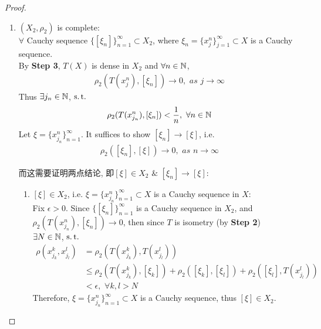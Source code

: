 \begin{thm}
\begin{proof}
\begin{enumerate}
				\item $(X_2 , \rho_2)$ is complete: \\
				$\forall$ Cauchy sequence $\{ [\xi_n] \}_{n = 1}^{\infty} \subset X_2$, where $\xi_n = \{ x_{j}^n \}_{j = 1}^{\infty} \subset X$ is a Cauchy sequence. \\
				By \textbf{Step 3}, $T(X)$ is dense in $X_2$ and $\forall n \in \mathbb{N}$,
				\begin{align}
					\rho_2(T(x_{j}^{n}) , [\xi_n]) \to 0 , \,\, as \,\, j \to \infty
				\end{align}
				Thus $\exists j_n \in \mathbb{N}$, $\operatorname{s.t.}$
				\begin{align}
					\rho_2(T(x_{j_n}^n) , [\xi_n]) < \frac{1}{n} , \,\, \forall n \in \mathbb{N}
				\end{align}
				Let $\xi = \{ x_{j_n}^n \}_{n = 1}^{\infty}$. It suffices to show $[\xi_n] \to [\xi]$, i.e.
				\begin{align}
					\rho_2([\xi_n] , [\xi]) \to 0 , \,\, as \,\, n \to \infty
				\end{align}
				
				\vspace{2em}
				而这需要证明两点结论, 即$[\xi] \in X_2 \,\, \& \,\, [\xi_n] \to [\xi]$:
				
				\newpage
				\begin{enumerate}
					\item $[\xi] \in X_2$, i.e. $\xi = \{ x_{j_n}^n \}_{n = 1}^{\infty} \subset X$ is a Cauchy sequence in $X$: \\
					Fix $\epsilon > 0$. Since $\{ [\xi_n] \}_{n = 1}^{\infty}$ is a Cauchy sequence in $X_2$, and $\rho_2(T(x_{j_n}^n) , [\xi_n]) \to 0$, then since $T$ is isometry (by \textbf{Step 2})\\
					$\exists N \in \mathbb{N}$, $\operatorname{s.t.}$
					\begin{align}
						\rho(x_{j_k}^k , x_{j_l}^l)
						&= \rho_2(T(x_{j_k}^k) , T(x_{j_l}^l)) \\
						&\leq \rho_2(T(x_{j_k}^k) , [\xi_k]) + \rho_2([\xi_k] , [\xi_l]) + \rho_2([\xi_l] , T(x_{j_l}^l)) \\
						&< \epsilon , \,\, \forall k , l > N
					\end{align}
					Therefore, $\xi = \{ x_{j_n}^n \}_{n = 1}^{\infty} \subset X$ is a Cauchy sequence, thus $[\xi] \in X_2$.
					

\end{enumerate}
\end{enumerate}
\end{proof}
\end{thm}
